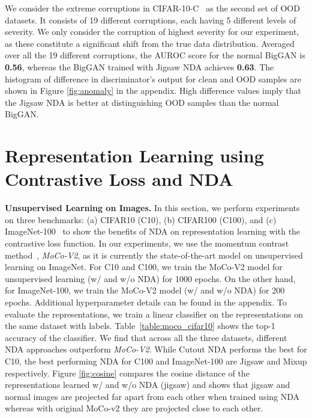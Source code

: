 \documentclass{article} \usepackage{iclr2021_conference,times}
\begin{document}
We consider the extreme corruptions in CIFAR-10-C~\citep{hendrycks2018benchmarking} as the second set of  OOD datasets. It consists of 19 different corruptions, each having 5 different levels of severity. We only consider the corruption of highest severity for our experiment, as these constitute a significant shift from the true data distribution. Averaged over all the 19 different corruptions, the AUROC score for the normal BigGAN is \textbf{0.56}, whereas the BigGAN trained with Jigsaw NDA achieves \textbf{0.63}.
The histogram of difference in discriminator's output for clean and OOD samples are shown in Figure \ref{fig:anomaly} 
in the appendix. 
High difference values imply that the Jigsaw NDA is better at distinguishing OOD samples than the normal BigGAN. 












\section{Representation Learning using Contrastive Loss and NDA}







\textbf{Unsupervised Learning on Images.}
In this section, we perform experiments on three benchmarks: (a) CIFAR10 (C10), (b) CIFAR100 (C100), and (c) ImageNet-100~\citep{deng2009imagenet} to show the benefits of NDA on representation learning with the contrastive loss function. In our experiments, we use the momentum contrast method~\citep{he2019momentum}, \emph{MoCo-V2}, as it is currently the state-of-the-art model on unsupervised learning on ImageNet. For C10 and C100, we train the MoCo-V2 model for unsupervised learning (w/ and w/o NDA)  for 1000 epochs. On the other hand, for ImageNet-100, we train the MoCo-V2 model (w/ and w/o NDA) for 200 epochs. Additional hyperparameter details can be found in the appendix. To evaluate the representations, we train a linear classifier on the representations on the same dataset with labels.
Table~\ref{table:moco_cifar10} shows the top-1 accuracy of the classifier. We find that across all the three datasets, different NDA approaches outperform \emph{MoCo-V2}. While Cutout NDA performs the best for C10, the best performing NDA for C100 and ImageNet-100 are Jigsaw and Mixup respectively. Figure \ref{fig:cosine} compares the cosine distance of the representations learned w/ and w/o NDA (jigsaw) and shows that jigsaw and normal images are projected far apart from each other when trained using NDA whereas with original MoCo-v2 they are projected close to each other.
\end{document}
